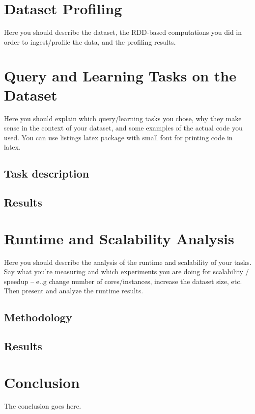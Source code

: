 \documentclass[conference]{IEEEtran}
\begin{document}
\section{Dataset Profiling}

Here you should describe the dataset, the RDD-based computations you did in order to ingest/profile the data, and the profiling results.

\section{Query and Learning Tasks on the Dataset}

Here you should explain which query/learning tasks you chose, why they make sense in the context of your dataset, and some examples of the actual code you used.  You can use listings latex package with small font for printing code in latex.

\subsection{Task description}

\subsection{Results}

\section{Runtime and Scalability Analysis}

Here you should describe the analysis of the runtime and scalability of your tasks.  Say what you're measuring and which experiments you are doing for scalability / speedup -- e..g change number of cores/instances, increase the dataset size, etc. Then present and analyze the runtime results.


\subsection{Methodology}


\subsection{Results}

\section{Conclusion}
The conclusion goes here.
\end{document}
